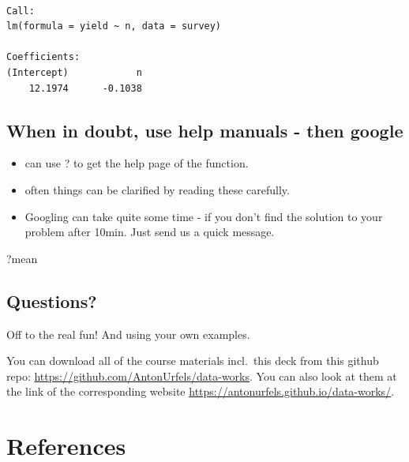 \documentclass[
  letterpaper,
  DIV=11,
  numbers=noendperiod]{scrreprt}
\newenvironment{Shaded}{\begin{snugshade}}{\end{snugshade}}
\newcommand{\NormalTok}[1]{\textcolor[rgb]{0.00,0.23,0.31}{#1}}
\providecommand{\tightlist}{%
  \setlength{\itemsep}{0pt}\setlength{\parskip}{0pt}}\usepackage{longtable,booktabs,array}
\newlength{\cslhangindent}
\newlength{\cslentryspacingunit} %
\newenvironment{CSLReferences}[2] %
 {%
  \setlength{\parindent}{0pt}
  \ifodd #1
  \let\oldpar\par
  \def\par{\hangindent=\cslhangindent\oldpar}
  \fi
  \setlength{\parskip}{#2\cslentryspacingunit}
 }%
 {}
\begin{document}
\begin{verbatim}

Call:
lm(formula = yield ~ n, data = survey)

Coefficients:
(Intercept)            n  
    12.1974      -0.1038  
\end{verbatim}

\hypertarget{when-in-doubt-use-help-manuals---then-google}{%
\section{When in doubt, use help manuals - then
google}\label{when-in-doubt-use-help-manuals---then-google}}

\begin{itemize}
\tightlist
\item
  can use ? to get the help page of the function.
\item
  often things can be clarified by reading these carefully.
\item
  Googling can take quite some time - if you don't find the solution to
  your problem after 10min. Just send us a quick message.
\end{itemize}

\begin{Shaded}
\begin{Highlighting}[]
\NormalTok{?mean}
\end{Highlighting}
\end{Shaded}

\hypertarget{questions-1}{%
\section{Questions?}\label{questions-1}}

Off to the real fun! And using your own examples.

You can download all of the course materials incl.~this deck from this
github repo: \url{https://github.com/AntonUrfels/data-works}. You can
also look at them at the link of the corresponding website
\url{https://antonurfels.github.io/data-works/}.


\hypertarget{references}{%
\chapter*{References}\label{references}}


\hypertarget{refs}{}
\begin{CSLReferences}{0}{0}
\end{CSLReferences}
\end{document}
